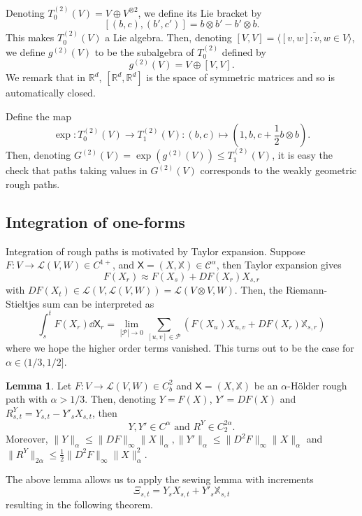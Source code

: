\documentclass[]{article}
\theoremstyle{definition}
\theoremstyle{definition}
\newtheorem{lemma}{Lemma}
\begin{document}
Denoting \(T^{(2)}_0(V) = V \oplus V^{\otimes 2}\), we define its Lie bracket by 
\[[(b, c), (b', c')] = b \otimes b' - b' \otimes b.\]
This makes \(T^{(2)}_0(V)\) a Lie algebra. Then, denoting \([V, V] = \overline{\langle [v, w] : v, w \in V\rangle}\),
we define \(g^{(2)}(V)\) to be the subalgebra of \(T^{(2)}_0\) defined by 
\[g^{(2)}(V) = V \oplus [V, V].\]
We remark that in \(\mathbb{R}^d\), \([\mathbb{R}^d, \mathbb{R}^d]\) is the space of symmetric matrices 
and so is automatically closed.

Define the map 
\[\exp : T^{(2)}_0(V) \to T^{(2)}_1(V) : (b, c) \mapsto \left(1, b, c + \frac{1}{2}b \otimes b\right).\]
Then, denoting \(G^{(2)}(V) = \exp(g^{(2)}(V)) \le T^{(2)}_1(V)\), it is easy the check that paths 
taking values in \(G^{(2)}(V)\) corresponds to the weakly geometric rough paths.

\subsection*{Integration of one-forms}

Integration of rough paths is motivated by Taylor expansion. Suppose \(F : V \to \mathcal{L}(V, W) \in C^{1 +}\), and 
\(\mathsf{X} = (X, \mathbb{X}) \in \mathcal{C}^\alpha\), then Taylor expansion gives
\[F(X_r) \approx F(X_s) + DF(X_r)X_{s, r}\]
with \(DF(X_t) \in \mathcal{L}(V, \mathcal{L}(V, W)) = \mathcal{L}(V \otimes V, W)\). Then, the Riemann-Stieltjes 
sum can be interpreted as 
\begin{equation}\label{eq:rs-sum}
  \int_s^t F(X_r) \dd \mathsf{X}_r = 
  \lim_{|\mathcal{P}| \to 0} \sum_{[u, v] \in \mathcal{P}} \left(F(X_u)X_{u, v} + DF(X_r)\mathbb{X}_{s, r}\right)
\end{equation}
where we hope the higher order terms vanished. This turns out to be the case for \(\alpha \in (1/3, 1/2]\).

\begin{lemma}\label{lem:control}
  Let \(F : V \to \mathcal{L}(V, W) \in C^2_b\) and \(\mathsf{X} = (X, \mathbb{X})\) be an \(\alpha\)-H\"older 
  rough path with \(\alpha > 1/3\).
  Then, denoting \(Y = F(X)\), \(Y' = DF(X)\) and \(R^Y_{s, t} = Y_{s, t} - Y'_s X_{s, t}\), then 
  \[Y, Y' \in C^\alpha \text{ and } R^Y \in C_2^{2\alpha}.\]
  Moreover, \(\|Y\|_\alpha \le \|DF\|_\infty\|X\|_\alpha, \|Y'\|_\alpha \le \|D^2F\|_\infty\|X\|_\alpha\) 
  and \(\|R^Y\|_{2\alpha} \le \frac{1}{2}\|D^2F\|_\infty\|X\|_\alpha^2\).
\end{lemma}

The above lemma allows us to apply the sewing lemma with increments 
\[\Xi_{s, t} = Y_s X_{s, t} + Y'_s \mathbb{X}_{s, t}\]
resulting in the following theorem.
\end{document}
